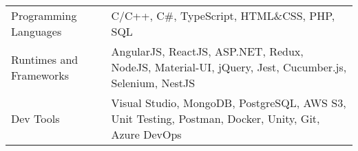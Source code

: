 

\vspace{2mm}\fontsize{1}{15}
\begin{justify}
	\begin{tabularx}{\linewidth}{
			>{\hsize=0.8\hsize}X%
			>{\hsize=1.2\hsize}X%
		}
		Programming Languages	 	& C/C++, C\#, TypeScript, HTML\&CSS, PHP, SQL \\
		Runtimes and Frameworks		& AngularJS, ReactJS, ASP.NET, Redux, NodeJS, Material-UI, jQuery, Jest, Cucumber.js, Selenium, NestJS\\
		Dev Tools					& Visual Studio, MongoDB, PostgreSQL, AWS S3, Unit Testing, Postman, Docker, Unity, Git, Azure DevOps
	\end{tabularx}
\end{justify}
